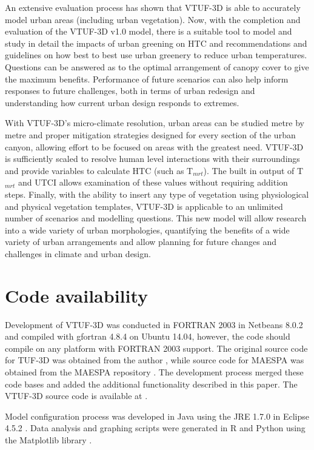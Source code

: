 \documentclass[final,3p,times,authoryear]{elsarticle}
\begin{document}
An extensive evaluation process has shown that VTUF-3D is able to accurately model urban areas (including urban vegetation). Now, with the completion and evaluation of the VTUF-3D v1.0 model, there is a suitable tool to model and study in detail the impacts of urban greening on HTC and recommendations and guidelines on how best to best use urban greenery to reduce urban temperatures. Questions can be answered as to the optimal arrangement of canopy cover to give the maximum benefits. Performance of future scenarios can also help inform responses to future challenges, both in terms of urban redesign and understanding how current urban design responds to extremes.

With VTUF-3D's micro-climate resolution, urban areas can be studied metre by metre and proper mitigation strategies designed for every section of the urban canyon, allowing effort to be focused on areas with the greatest need. VTUF-3D is sufficiently scaled to resolve human level interactions with their surroundings and provide variables to calculate HTC (such as T$_{mrt}$). The built in output of T$_{mrt}$ and UTCI allows examination of these values without requiring addition steps. Finally, with the ability to insert any type of vegetation using physiological and physical vegetation templates, VTUF-3D is applicable to an unlimited number of scenarios and modelling questions. This new model will allow research into a wide variety of urban morphologies, quantifying the benefits of a wide variety of urban arrangements and allow planning for future changes and challenges in climate and urban design.

\section{Code availability}\label{sec:available}

Development of VTUF-3D was conducted in FORTRAN 2003 \citep{GNU2016a} in Netbeans 8.0.2 \citep{Netbeans2016} and compiled with gfortran 4.8.4 \citep{GNU2016} on Ubuntu 14.04, however, the code should compile on any platform with FORTRAN 2003 support. The original source code for TUF-3D was obtained from the author \citep{Krayenhoff2007}, while source code for MAESPA was obtained from the MAESPA repository \citep{Duursma2016}. The development process merged these code bases and added the additional functionality described in this paper. The VTUF-3D source code is available at \cite{Nice2016c}.

Model configuration process was developed in Java using the JRE 1.7.0 \citep{Oracle2016} in Eclipse 4.5.2 \citep{Eclipse2016}. Data analysis and graphing scripts were generated in R \citep{R2013} and Python \citep{Python2016} using the Matplotlib library \citep{Hunter2007}. 
\end{document}
